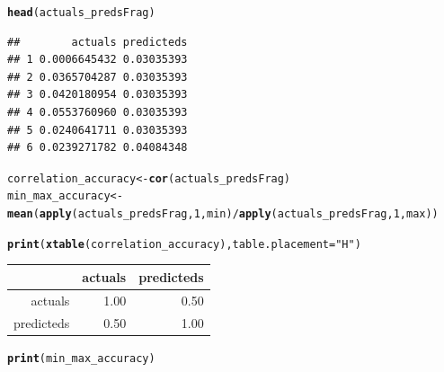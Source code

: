 \documentclass[10pt]{article}\usepackage[]{graphicx}\usepackage[]{color}
\makeatletter
\newcommand{\hlnum}[1]{\textcolor[rgb]{0.686,0.059,0.569}{#1}}%
\newcommand{\hlstr}[1]{\textcolor[rgb]{0.192,0.494,0.8}{#1}}%
\newcommand{\hlopt}[1]{\textcolor[rgb]{0,0,0}{#1}}%
\newcommand{\hlstd}[1]{\textcolor[rgb]{0.345,0.345,0.345}{#1}}%
\newcommand{\hlkwb}[1]{\textcolor[rgb]{0.69,0.353,0.396}{#1}}%
\newcommand{\hlkwc}[1]{\textcolor[rgb]{0.333,0.667,0.333}{#1}}%
\newcommand{\hlkwd}[1]{\textcolor[rgb]{0.737,0.353,0.396}{\textbf{#1}}}%
\newenvironment{kframe}{%
 \def\at@end@of@kframe{}%
 \ifinner\ifhmode%
  \def\at@end@of@kframe{\end{minipage}}%
  \begin{minipage}{\columnwidth}%
 \fi\fi%
 \def\FrameCommand##1{\hskip\@totalleftmargin \hskip-\fboxsep
 \colorbox{shadecolor}{##1}\hskip-\fboxsep
     \hskip-\linewidth \hskip-\@totalleftmargin \hskip\columnwidth}%
 \MakeFramed {\advance\hsize-\width
   \@totalleftmargin\z@ \linewidth\hsize
   \@setminipage}}%
 {\par\unskip\endMakeFramed%
 \at@end@of@kframe}
\newenvironment{knitrout}{}{} %
\makeatother
\begin{document}
\begin{knitrout}
\begin{kframe}
\begin{alltt}
\hlkwd{head}\hlstd{(actuals_predsFrag)}
\end{alltt}
\begin{verbatim}
##        actuals predicteds
## 1 0.0006645432 0.03035393
## 2 0.0365704287 0.03035393
## 3 0.0420180954 0.03035393
## 4 0.0553760960 0.03035393
## 5 0.0240641711 0.03035393
## 6 0.0239271782 0.04084348
\end{verbatim}
\begin{alltt}
\hlstd{correlation_accuracy} \hlkwb{<-} \hlkwd{cor}\hlstd{(actuals_predsFrag)}
\hlstd{min_max_accuracy} \hlkwb{<-} \hlkwd{mean}\hlstd{(}\hlkwd{apply}\hlstd{(actuals_predsFrag,} \hlnum{1}\hlstd{, min)} \hlopt{/} \hlkwd{apply}\hlstd{(actuals_predsFrag,} \hlnum{1}\hlstd{, max))}
\end{alltt}
\end{kframe}
\end{knitrout}


\begin{kframe}
\begin{alltt}
\hlkwd{print}\hlstd{(}\hlkwd{xtable}\hlstd{(correlation_accuracy),}\hlkwc{table.placement}\hlstd{=}\hlstr{"H"}\hlstd{)}
\end{alltt}
\end{kframe}%
\begin{table}[H]
\centering
\begin{tabular}{rrr}
  \hline
 & actuals & predicteds \\ 
  \hline
actuals & 1.00 & 0.50 \\ 
  predicteds & 0.50 & 1.00 \\ 
   \hline
\end{tabular}
\end{table}
\begin{kframe}\begin{alltt}
\hlkwd{print}\hlstd{(min_max_accuracy)}
\end{alltt}
\end{kframe}[1] 0.5303913
\end{document}
